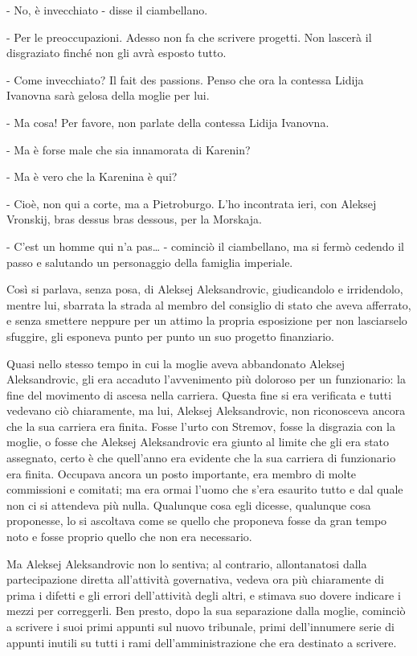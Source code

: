 - No, è invecchiato - disse il ciambellano. 

- Per le preoccupazioni. Adesso non fa che scrivere progetti. Non lascerà il disgraziato finché non gli avrà esposto tutto. 

- Come invecchiato? Il fait des passions. Penso che ora la contessa Lidija Ivanovna sarà gelosa della moglie per lui. 

- Ma cosa! Per favore, non parlate della contessa Lidija Ivanovna. 

- Ma è forse male che sia innamorata di Karenin? 

- Ma è vero che la Karenina è qui? 

- Cioè, non qui a corte, ma a Pietroburgo. L'ho incontrata ieri, con Aleksej Vronskij, bras dessus bras dessous, per la Morskaja. 

- C'est un homme qui n'a pas\ldots{} - cominciò il ciambellano, ma si fermò cedendo il passo e salutando un personaggio della famiglia imperiale. 

Così si parlava, senza posa, di Aleksej Aleksandrovic, giudicandolo e irridendolo, mentre lui, sbarrata la strada al membro del consiglio di stato che aveva afferrato, e senza smettere neppure per un attimo la propria esposizione per non lasciarselo sfuggire, gli esponeva punto per punto un suo progetto finanziario. 

Quasi nello stesso tempo in cui la moglie aveva abbandonato Aleksej Aleksandrovic, gli era accaduto l'avvenimento più doloroso per un funzionario: la fine del movimento di ascesa nella carriera. Questa fine si era verificata e tutti vedevano ciò chiaramente, ma lui, Aleksej Aleksandrovic, non riconosceva ancora che la sua carriera era finita. Fosse l'urto con Stremov, fosse la disgrazia con la moglie, o fosse che Aleksej Aleksandrovic era giunto al limite che gli era stato assegnato, certo è che quell'anno era evidente che la sua carriera di funzionario era finita. Occupava ancora un posto importante, era membro di molte commissioni e comitati; ma era ormai l'uomo che s'era esaurito tutto e dal quale non ci si attendeva più nulla. Qualunque cosa egli dicesse, qualunque cosa proponesse, lo si ascoltava come se quello che proponeva fosse da gran tempo noto e fosse proprio quello che non era necessario. 

Ma Aleksej Aleksandrovic non lo sentiva; al contrario, allontanatosi dalla partecipazione diretta all'attività governativa, vedeva ora più chiaramente di prima i difetti e gli errori dell'attività degli altri, e stimava suo dovere indicare i mezzi per correggerli. Ben presto, dopo la sua separazione dalla moglie, cominciò a scrivere i suoi primi appunti sul nuovo tribunale, primi dell'innumere serie di appunti inutili su tutti i rami dell'amministrazione che era destinato a scrivere. 

